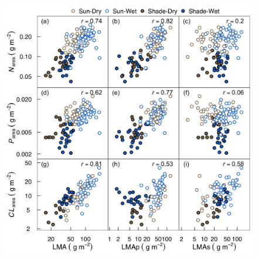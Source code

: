 \documentclass[
  12pt,
]{article}
\providecommand{\DIFaddbeginFL}{} %
\providecommand{\DIFdelbeginFL}{} %
\providecommand{\DIFdelendFL}{} %
\newcommand{\DIFscaledelfig}{0.5}
\newlength{\DIFdelgraphicswidth} %
\newlength{\DIFdelgraphicsheight} %
\newcommand{\DIFaddincludegraphics}[2][]{{\color{blue}\fbox{\DIFOincludegraphics[#1]{#2}}}} %
\newcommand{\DIFdelincludegraphics}[2][]{%
\sbox{\DIFdelgraphicsbox}{\DIFOincludegraphics[#1]{#2}}%
\settoboxwidth{\DIFdelgraphicswidth}{\DIFdelgraphicsbox} %
\settoboxtotalheight{\DIFdelgraphicsheight}{\DIFdelgraphicsbox} %
\scalebox{\DIFscaledelfig}{%
\parbox[b]{\DIFdelgraphicswidth}{\usebox{\DIFdelgraphicsbox}\\[-\baselineskip] \rule{\DIFdelgraphicswidth}{0em}}\llap{\resizebox{\DIFdelgraphicswidth}{\DIFdelgraphicsheight}{%
\setlength{\unitlength}{\DIFdelgraphicswidth}%
\begin{picture}(1,1)%
\thicklines\linethickness{2pt} %
{\color[rgb]{1,0,0}\put(0,0){\framebox(1,1){}}}%
{\color[rgb]{1,0,0}\put(0,0){\line( 1,1){1}}}%
{\color[rgb]{1,0,0}\put(0,1){\line(1,-1){1}}}%
\end{picture}%
}\hspace*{3pt}}} %
} %
\DeclareRobustCommand{\DIFaddbeginFL}{\DIFOaddbeginFL \let\includegraphics\DIFaddincludegraphics} %
\DeclareRobustCommand{\DIFdelbeginFL}{\DIFOdelbeginFL \let\includegraphics\DIFdelincludegraphics} %
\DeclareRobustCommand{\DIFdelendFL}{\DIFOaddendFL \let\includegraphics\DIFOincludegraphics} %
\begin{document}
\begin{figure}
\DIFdelbeginFL %
\DIFdelendFL \DIFaddbeginFL \hypertarget{fig:PA-NPC}{%
\centering
\includegraphics{../figs/PA_NPC.png}
}
\end{figure}
\end{document}
